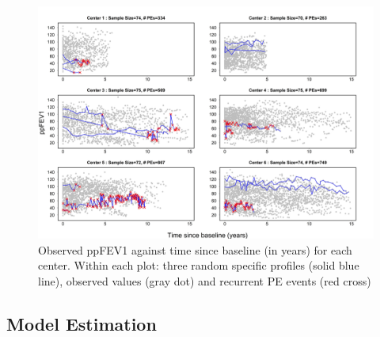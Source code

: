 \begin{figure}[ht]
\includegraphics[width=\textwidth]{Figures/Chp3_trajectory.jpg}
\caption{Observed ppFEV1 against time since baseline (in years) for each center. Within each plot: three random specific profiles (solid blue line), observed values (gray dot) and recurrent PE events (red cross)}
\label{fig:chp3_traj}
\end{figure}

\subsection{Model Estimation}

